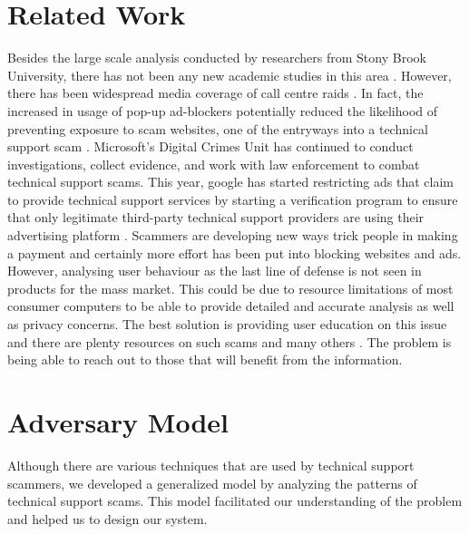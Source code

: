 \documentclass[final]{IEEEtran}
\begin{document}
\section{Related Work} %
Besides the large scale analysis conducted by researchers from Stony Brook University, there has not been any new academic studies in this area \cite{b2}. However, there has been widespread media coverage of call centre raids \cite{b6}. In fact, the increased in usage of pop-up ad-blockers potentially reduced the likelihood  of preventing exposure to scam websites, one of the entryways into a technical support scam \cite{b7}. Microsoft's Digital Crimes Unit has continued to conduct investigations, collect evidence, and work with law enforcement to combat technical support scams. This year, google has started restricting ads that claim to provide technical support services by starting a verification program to ensure that only legitimate third-party technical support providers are using their advertising platform \cite{b8}. Scammers are developing new ways trick people in making a payment and certainly more effort has been put into blocking websites and ads. However, analysing user behaviour as the last line of defense is not seen in products for the mass market. This could be due to resource limitations of most consumer computers to be able to provide detailed and accurate analysis as well as privacy concerns. The best solution is providing user education on this issue and there are plenty resources on such scams and many others \cite{b10}. The problem is being able to reach out to those that will benefit from the information.


\section{Adversary Model} %
Although there are various techniques that are used by technical support scammers, we developed a generalized model by analyzing the patterns of technical support scams. This model facilitated our understanding of the problem and helped us to design our system.
\end{document}
